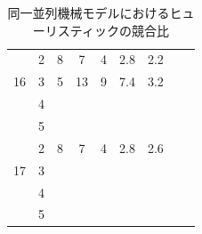 \documentclass[12pt]{optlab-bachelor}
\begin{document}
\begin{table}[htb]
\begin{center}
\begin{tabular}{|c|c|c|c|c|c|c|c|c|}
      & 2 & 8 & 7 & 4 & 2.8 & 2.2 \\ \cline{2-7}
      16 & 3 & 5 & 13 & 9 & 7.4 & 3.2 \\ \cline{2-7}
      & 4 &  &  &  &  &  \\ \cline{2-7}
      & 5 &  &  &  &  &  \\ \hline \hline

      & 2 & 8 & 7 & 4 & 2.8 & 2.6 \\ \cline{2-7}
      17 & 3 &  &  &  &  &  \\ \cline{2-7}
      & 4 &  &  &  &  &  \\ \cline{2-7}
      & 5 &  &  &  &  &  \\ \hline \hline
    \end{tabular}
    \caption{同一並列機械モデルにおけるヒューリスティックの競合比}
    \label{A5}
  \end{center}
\end{table}
\end{document}
